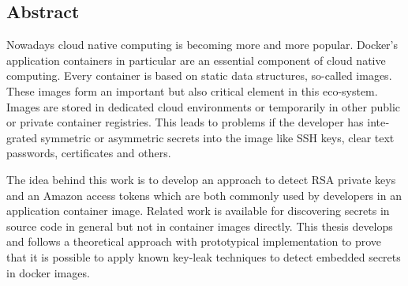 
\begin{otherlanguage}{american}
\chapter*{Abstract}
Nowadays cloud native computing is becoming more and more popular. Docker's application containers in particular are an essential component of cloud native computing. Every container is based on static data structures, so-called images. These images form an important but also critical element in this eco-system.
Images are stored in dedicated cloud environments or temporarily in other public or private container registries. This leads to problems if the developer has integrated symmetric or asymmetric secrets into the image like SSH keys, clear text passwords, certificates and others.

The idea behind this work is to develop an approach to detect RSA private keys and an Amazon access tokens which are both commonly used by developers in an application container image. Related work is available for discovering secrets in source code in general but not in container images directly. This thesis develops and follows a theoretical approach with prototypical implementation to prove that it is possible to apply known key-leak techniques to detect embedded secrets in docker images.
\end{otherlanguage}